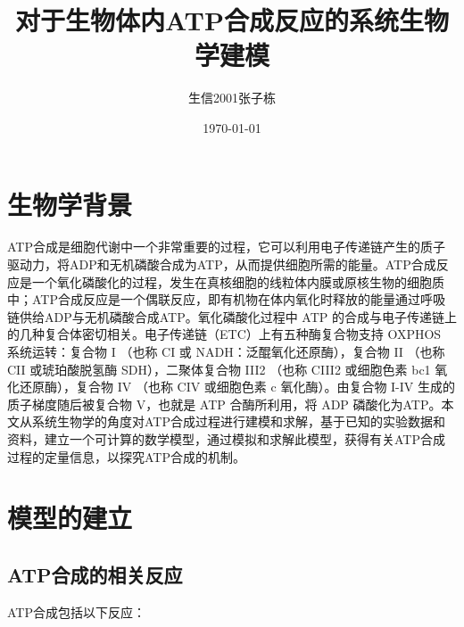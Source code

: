 \documentclass{ctexart}
\title{对于生物体内ATP合成反应的系统生物学建模}
\author{生信2001张子栋}
\date{\today}
\begin{document}
\maketitle
\thispagestyle{empty}

\newpage

\tableofcontents

\setcounter{page}{0}

\thispagestyle{empty}

\newpage

\section{生物学背景}
ATP合成是细胞代谢中一个非常重要的过程，它可以利用电子传递链产生的质子驱动力，将ADP和无机磷酸合成为ATP，从而提供细胞所需的能量。ATP合成反应是一个氧化磷酸化的过程，发生在真核细胞的线粒体内膜或原核生物的细胞质中；ATP合成反应是一个偶联反应，即有机物在体内氧化时释放的能量通过呼吸链供给ADP与无机磷酸合成ATP。氧化磷酸化过程中 ATP 的合成与电子传递链上的几种复合体密切相关。电子传递链（ETC）上有五种酶复合物支持 OXPHOS 系统运转：复合物 I （也称 CI 或 NADH：泛醌氧化还原酶），复合物 II （也称 CII 或琥珀酸脱氢酶 SDH），二聚体复合物 III2 （也称 CIII2 或细胞色素 bc1 氧化还原酶），复合物 IV （也称 CIV 或细胞色素 c 氧化酶）。由复合物 I-IV 生成的质子梯度随后被复合物 V，也就是 ATP 合酶所利用，将 ADP 磷酸化为ATP。本文从系统生物学的角度对ATP合成过程进行建模和求解，基于已知的实验数据和资料，建立一个可计算的数学模型，通过模拟和求解此模型，获得有关ATP合成过程的定量信息，以探究ATP合成的机制。

\section{模型的建立}
\subsection{ATP合成的相关反应}
ATP合成包括以下反应：
\quad\\





\quad\\
\end{document}
